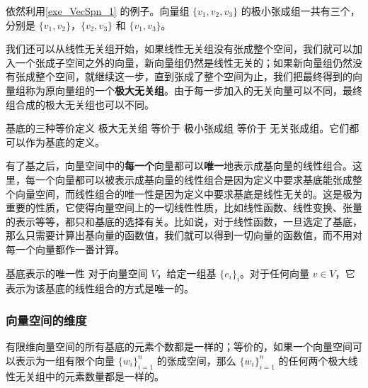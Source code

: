 \begin{example}{}
依然利用\autoref{exe_VecSpn_1} 的例子。向量组 $\{v_1, v_2, v_3\}$ 的极小张成组一共有三个，分别是 $\{v_1, v_2\}$，$\{v_2, v_3\}$ 和 $\{v_1, v_3\}$。
\end{example}

我们还可以从线性无关组开始，如果线性无关组没有张成整个空间，我们就可以加入一个张成子空间之外的向量，新向量组仍然是线性无关的；如果新向量组仍然没有张成整个空间，就继续这一步，直到张成了整个空间为止，我们把最终得到的向量组称为原向量组的一个\textbf{极大无关组}。由于每一步加入的无关向量可以不同，最终组合成的极大无关组也可以不同。

\begin{theorem}{基底的三种等价定义}
极大无关组 等价于 极小张成组 等价于 无关张成组。它们都可以作为基底的定义。
\end{theorem}


有了基之后，向量空间中的\textbf{每一个}向量都可以\textbf{唯一}地表示成基向量的线性组合。这里，每一个向量都可以被表示成基向量的线性组合是因为定义中要求基底能张成整个向量空间，而线性组合的唯一性是因为定义中要求基底是线性无关的。这是极为重要的性质，它使得向量空间上的一切线性性质，比如线性函数、线性变换、张量的表示等等，都只和基底的选择有关。比如说，对于线性函数，一旦选定了基底，那么只需要计算出基向量的函数值，我们就可以得到一切向量的函数值，而不用对每一个向量都作一番计算。

\begin{theorem}{基底表示的唯一性}\label{the_VecSpn_1}
对于向量空间 $V$，给定一组基 $\{e_i\}_i$。对于任何向量 $v\in V$，它表示为该基底的线性组合的方式是唯一的。
\end{theorem}

\subsubsection{向量空间的维度}
% 


\begin{theorem}{}\label{the_VecSpn_2}
有限维向量空间的所有基底的元素个数都是一样的；等价的，如果一个向量空间可以表示为一组有限个向量 $\{w_i\}_{i = 1}^n$ 的张成空间，那么 $\{w_i\}_{i = 1}^n$ 的任何两个极大线性无关组中的元素数量都是一样的。
\end{theorem}

